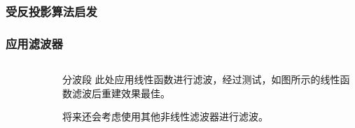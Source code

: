 \documentclass[12pt,aspectratio=169]{beamer} %
\begin{document}
\begin{frame}
    \frametitle{受反投影算法启发}
        \begin{figure}
        \end{figure}
\end{frame}

\begin{frame}
    \frametitle{应用滤波器}
        \begin{columns}
            \begin{column}{0.5\textwidth}
                \begin{figure}
                    
                \end{figure} 
            \end{column}
            \begin{column}{0.4\textwidth}
                \begin{block}{分波段}
                    此处应用线性函数进行滤波，经过测试，如图所示的线性函数滤波后重建效果最佳。

                    将来还会考虑使用其他非线性滤波器进行滤波。
                \end{block}
            \end{column}
        \end{columns}
\end{frame}
\end{document}
